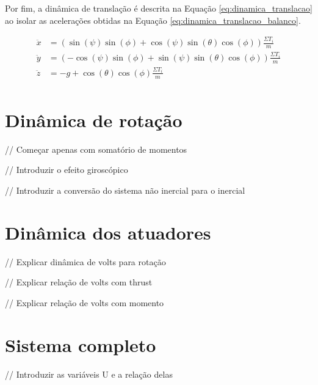 \documentclass[main.tex]{subfiles}
\begin{document}
Por fim, a dinâmica de translação é descrita na Equação \ref{eq:dinamica_translacao} ao isolar as acelerações obtidas na Equação \ref{eq:dinamica_translacao_balanco}.

\begin{equation}\label{eq:dinamica_translacao}
    \begin{split}
        \ddot{x} &= (\sin{(\psi)}\sin{(\phi)} + \cos{(\psi)}\sin{(\theta)}\cos{(\phi)})\frac{\Sigma T_i}{m}\\
        \ddot{y} &= (-\cos{(\psi)}\sin{(\phi)} + \sin{(\psi)}\sin{(\theta)}\cos{(\phi)})\frac{\Sigma T_i}{m}\\
        \ddot{z} &= -g + \cos{(\theta)}\cos{(\phi)}\frac{\Sigma T_i}{m}\\
    \end{split}
\end{equation}

\section{Dinâmica de rotação}

\textcolor{anotacao}{// Começar apenas com somatório de momentos}

\textcolor{anotacao}{// Introduzir o efeito giroscópico}

\textcolor{anotacao}{// Introduzir a conversão do sistema não inercial para o inercial}

\section{Dinâmica dos atuadores}

\textcolor{anotacao}{// Explicar dinâmica de volts para rotação}

\textcolor{anotacao}{// Explicar relação de volts com thrust}

\textcolor{anotacao}{// Explicar relação de volts com momento}


\section{Sistema completo}

\textcolor{anotacao}{// Introduzir as variáveis U e a relação delas}





\end{document}
